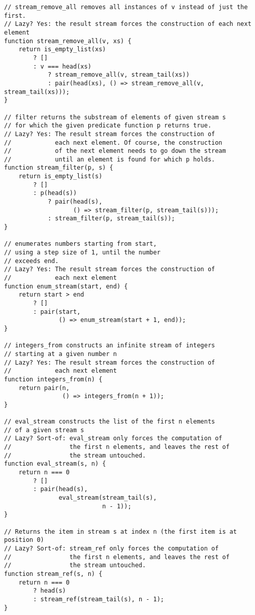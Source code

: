 \begin{lstlisting}
// stream_remove_all removes all instances of v instead of just the first.
// Lazy? Yes: the result stream forces the construction of each next element
function stream_remove_all(v, xs) {
    return is_empty_list(xs)
        ? []
        : v === head(xs)
            ? stream_remove_all(v, stream_tail(xs))
            : pair(head(xs), () => stream_remove_all(v, stream_tail(xs))); 
}

// filter returns the substream of elements of given stream s
// for which the given predicate function p returns true.
// Lazy? Yes: The result stream forces the construction of
//            each next element. Of course, the construction
//            of the next element needs to go down the stream
//            until an element is found for which p holds.
function stream_filter(p, s) {
    return is_empty_list(s)
        ? []
        : p(head(s))
            ? pair(head(s), 
                   () => stream_filter(p, stream_tail(s)));
            : stream_filter(p, stream_tail(s));
}

// enumerates numbers starting from start,
// using a step size of 1, until the number
// exceeds end.
// Lazy? Yes: The result stream forces the construction of
//            each next element
function enum_stream(start, end) {
    return start > end
        ? []
        : pair(start, 
               () => enum_stream(start + 1, end)); 
}

// integers_from constructs an infinite stream of integers
// starting at a given number n
// Lazy? Yes: The result stream forces the construction of
//            each next element
function integers_from(n) {
    return pair(n,
                () => integers_from(n + 1));
}

// eval_stream constructs the list of the first n elements
// of a given stream s
// Lazy? Sort-of: eval_stream only forces the computation of
//                the first n elements, and leaves the rest of
//                the stream untouched.
function eval_stream(s, n) {
    return n === 0
        ? []
        : pair(head(s),
               eval_stream(stream_tail(s),
                           n - 1));
}

// Returns the item in stream s at index n (the first item is at position 0)
// Lazy? Sort-of: stream_ref only forces the computation of
//                the first n elements, and leaves the rest of
//                the stream untouched.
function stream_ref(s, n) {
    return n === 0
        ? head(s)
        : stream_ref(stream_tail(s), n - 1);
}
\end{lstlisting}
